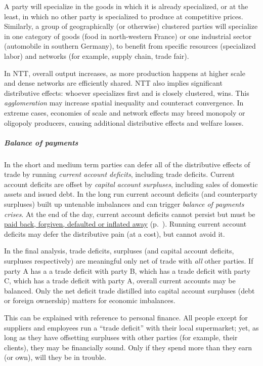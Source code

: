 \begin{description}
A party will specialize in the goods in which it is already specialized, or at the least, in which no other party is specialized to produce at competitive prices.
Similarly, a group of geographically (or otherwise) clustered parties will specialize in one category of goods (food in north-western France) or one industrial sector (automobile in southern Germany), to benefit from specific resources (specialized labor) and networks (for example, supply chain, trade fair).

	In \gls{NTT}, overall output increases, as more production happens at higher scale and dense networks are efficiently shared.
\gls{NTT} also implies significant distributive effects:
whoever specializes first and is closely clustered, wins.
This \emph{agglomeration} may increase spatial inequality and counteract convergence.
	In extreme cases, economies of scale and network effects may breed monopoly or oligopoly producers, causing additional distributive effects and welfare losses.
\end{description}

\subparagraph{Balance of payments}
In the short and medium term parties can defer all of the distributive effects of trade by running \emph{current account deficits}, including trade deficits.
Current account deficits are offset by \emph{capital account surpluses}, including sales of domestic assets and issued debt.
In the long run current account deficits (and counterparty surpluses) built up untenable imbalances and can trigger \emph{balance of payments crises}.
At the end of the day, current account deficits cannot persist but must be \hyperref[sec:imbalances]{paid back, forgiven, defaulted or inflated away} (p.~\pageref{sec:imbalances}).
Running current account deficits may defer the distributive pain (at a cost), but cannot avoid it.

In the final analysis, trade deficits, surpluses (and capital account deficits, surpluses respectively) are meaningful only net of trade with \emph{all} other parties.
If party A has a a trade deficit with party B, which has a trade deficit with party C, which has a trade deficit with party A, overall current accounts may be balanced.
Only the net deficit trade distilled into capital account surpluses (debt or foreign ownership) matters for economic imbalances.

This can be explained with reference to personal finance.
All people except for suppliers and employees run a ``trade deficit'' with their local supermarket;
yet, as long as they have offsetting surpluses with other parties (for example, their clients), they may be financially sound.
Only if they spend more than they earn (or own), will they be in trouble.%

